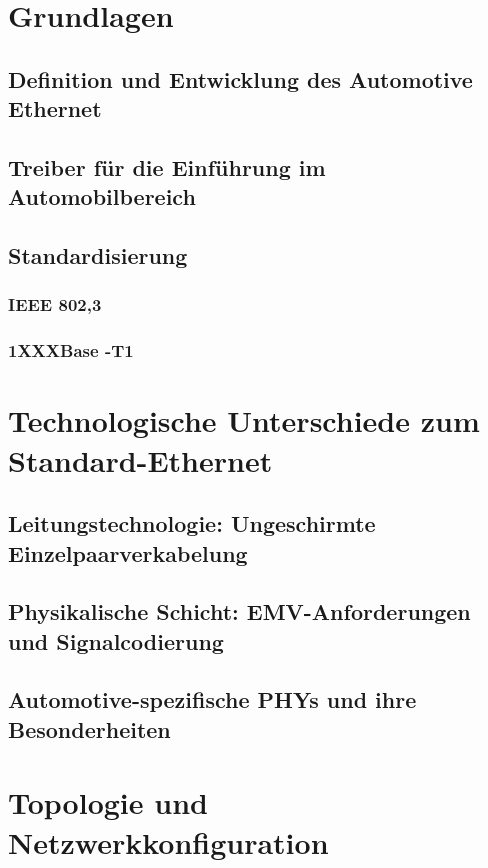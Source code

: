 
\chapter{Grundlagen}
\section{Definition und Entwicklung des Automotive Ethernet}
\section{Treiber für die Einführung im Automobilbereich}
\section{Standardisierung}
\subsection{IEEE 802,3}
\subsection{1XXXBase -T1}


\chapter{Technologische Unterschiede zum Standard-Ethernet}
\section{Leitungstechnologie: Ungeschirmte Einzelpaarverkabelung}
\section{Physikalische Schicht: EMV-Anforderungen und Signalcodierung}
\section{Automotive-spezifische PHYs und ihre Besonderheiten}

\chapter{Topologie und Netzwerkkonfiguration}
